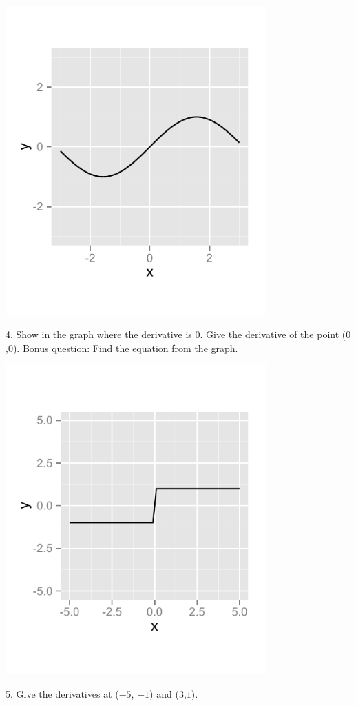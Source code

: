 \documentclass[a4paper]{report}
\begin{document}
\begin{Exercise}[title= Answer the following questions by looking at the graphs,label=ex0,difficulty=1]
\begin{minipage}{\rat\textwidth}
\includegraphics[width=0.75\textwidth]{1d.pdf}
\end{minipage}
\begin{minipage}{\rati\textwidth}
4. Show in the graph where the derivative is $0$. Give the derivative of the point ($0$,$0$). Bonus question: Find the equation from the graph.
\end{minipage}

\begin{minipage}{\rat\textwidth}
\includegraphics[width=0.75\textwidth]{1e.pdf}
\end{minipage}
\begin{minipage}{\rati\textwidth}
5. Give the derivatives at ($-5$, $-1$) and ($3$,$1$).
\end{minipage}



\end{Exercise}
\end{document}
